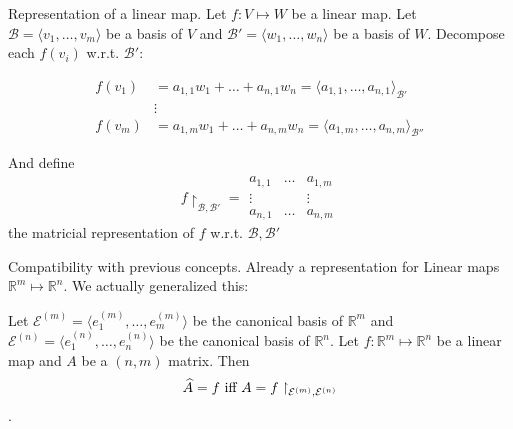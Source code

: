\documentclass{beamer}
\begin{document}
\begin{frame}{Representation of a linear map.}
  Let $f: V \mapsto W$ be a linear map. Let $\mathcal{B} = \langle v_1, \dots, v_m \rangle$ be a basis of $V$ and $\mathcal{B'} = \langle w_1, \dots, w_n \rangle$ be a basis of $W$. Decompose each $f(v_i)$ w.r.t. $\mathcal{B}'$:

  \[\begin{aligned}
  f(v_1) &= a_{1,1} w_1 + \dots + a_{n,1} w_n = \langle a_{1,1}, \dots, a_{n,1} \rangle_{\mathcal{B}'}\\
  &\vdots\\
  f(v_m) & = a_{1,m} w_1 + \dots + a_{n,m} w_n = \langle a_{1,m}, \dots, a_{n, m} \rangle_{\mathcal{B}''}
  \end{aligned}\]

  And define \[f\restriction_{\mathcal{B}, \mathcal{B'}} =  \begin{array}{|ccc|}
    a_{1,1} & \dots & a_{1,m}\\ \vdots & & \vdots\\ a_{n,1} & \dots & a_{n, m}
  \end{array}\] the matricial representation of $f$ w.r.t. $\mathcal{B}, \mathcal{B'}$
  
\end{frame}

\begin{frame}{Compatibility with previous concepts.}
  Already a representation for Linear maps $\mathbb{R}^m \mapsto \mathbb{R}^n$. We actually generalized this:

  Let $\mathcal{E}^{(m)}= \langle e^{(m)}_1, \dots, e^{(m)}_m \rangle$ be the canonical basis of $\mathbb{R}^m$ and $\mathcal{E}^{(n)} = \langle e^{(n)}_1, \dots, e^{(n)}_n \rangle$ be the canonical basis of $\mathbb{R}^n$.
  Let $f: \mathbb{R}^m \mapsto \mathbb{R}^n$ be a linear map and $A$ be a $(n,m)$ matrix. Then \[\widehat{A} = f \textnormal{ iff } A = f\restriction_{\mathcal{E}^{(m)}, \mathcal{E}^{(n)}}\].
\end{frame}
\end{document}

